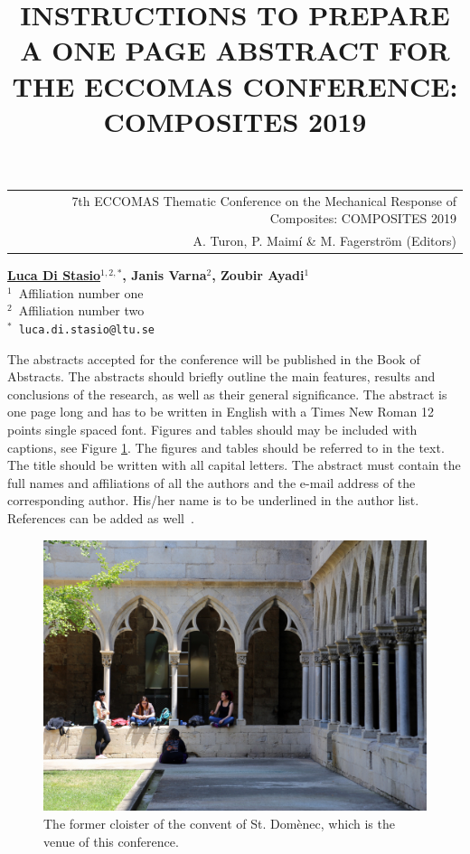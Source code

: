 \documentclass[12pt,a4paper]{article}
\begin{document}
\thispagestyle{empty}

\vspace*{-3.4cm}
\begin{table}[!h]
\begin{tabular}{r}
\hspace*{2.9cm} \scriptsize \textsf{7th ECCOMAS Thematic Conference on the Mechanical Response of Composites: COMPOSITES 2019} \\
\hspace*{2.9cm} \tiny \textsf{A. Turon, P. Maimí \& M. Fagerström (Editors)}
\end{tabular}
\end{table}

\vspace*{-0.7cm}

\begin{center}
\title{INSTRUCTIONS TO PREPARE A ONE PAGE ABSTRACT FOR THE ECCOMAS CONFERENCE: COMPOSITES 2019}
\end{center}
\begin{center}
\textbf{\underline{Luca Di Stasio}$^{1,2,*}$, Janis Varna$^{2}$, Zoubir Ayadi$^{1}$} \\ [7pt]
\small{$^1$~Affiliation number one}  \\  [2pt]
\small{$^2$~Affiliation number two}  \\  [2pt]
\small{$^*$~\texttt{luca.di.stasio@ltu.se}} \\
\end{center}

\noindent
The abstracts accepted for the conference will be published in the Book of Abstracts. The abstracts should briefly outline the main features, results and conclusions of the research, as well as their general significance. The abstract is one page long and has to be written in English with a Times New Roman 12 points single spaced font. Figures and tables should may be included with captions, see Figure \ref{fig:Claustre}. The figures and tables should be referred to in the text. The title should be written with all capital letters. The abstract must contain the full names and affiliations of all the authors and the e-mail address of the corresponding author. His/her name is to be underlined in the author list. References can be added as well~\cite{Barbero,Pimenta}.

\begin{figure}[h]
\centering\includegraphics[width=0.55\linewidth]{Claustre.pdf}
\caption{The former cloister of the convent of St. Domènec, which is the venue of this conference.}
\label{fig:Claustre}
\end{figure}
\end{document}
